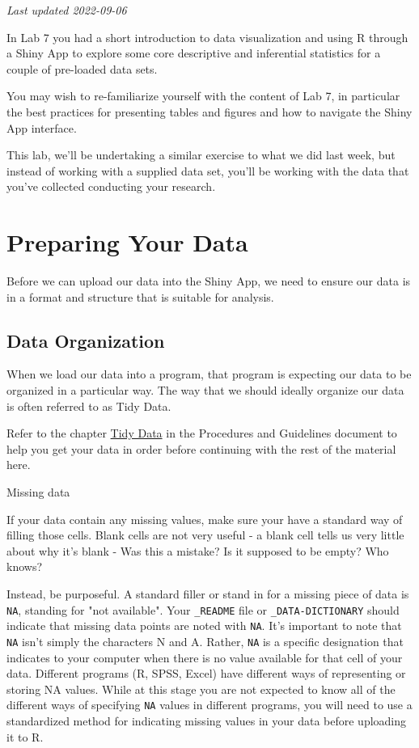 \documentclass[
]{book}
\begin{document}
\emph{Last updated 2022-09-06}

In Lab 7 you had a short introduction to data visualization and using R through a Shiny App to explore some core descriptive and inferential statistics for a couple of pre-loaded data sets.

You may wish to re-familiarize yourself with the content of Lab 7, in particular the best practices for presenting tables and figures and how to navigate the Shiny App interface.

This lab, we'll be undertaking a similar exercise to what we did last week, but instead of working with a supplied data set, you'll be working with the data that you've collected conducting your research.

\hypertarget{preparing-your-data}{%
\chapter*{Preparing Your Data}\label{preparing-your-data}}

Before we can upload our data into the Shiny App, we need to ensure our data is in a format and structure that is suitable for analysis.

\hypertarget{data-organization}{%
\section*{Data Organization}\label{data-organization}}

When we load our data into a program, that program is expecting our data to be organized in a particular way. The way that we should ideally organize our data is often referred to as Tidy Data.

Refer to the chapter \href{https://ubco-biology.github.io/Procedures-and-Guidelines/tidy-data.html}{Tidy Data} in the Procedures and Guidelines document to help you get your data in order before continuing with the rest of the material here.

Missing data

If your data contain any missing values, make sure your have a standard way of filling those cells. Blank cells are not very useful - a blank cell tells us very little about why it's blank - Was this a mistake? Is it supposed to be empty? Who knows?

Instead, be purposeful. A standard filler or stand in for a missing piece of data is \texttt{NA}, standing for "not available". Your \texttt{\_README} file or \texttt{\_DATA-DICTIONARY} should indicate that missing data points are noted with \texttt{NA}. It's important to note that \texttt{NA} isn't simply the characters N and A. Rather, \texttt{NA} is a specific designation that indicates to your computer when there is no value available for that cell of your data. Different programs (R, SPSS, Excel) have different ways of representing or storing NA values. While at this stage you are not expected to know all of the different ways of specifying \texttt{NA} values in different programs, you will need to use a standardized method for indicating missing values in your data before uploading it to R.
\end{document}
